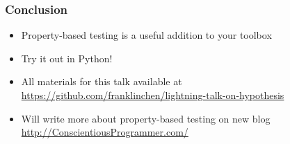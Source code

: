 \begin{frame}
  \frametitle{Conclusion}

  \begin{itemize}  
  \item Property-based testing is a useful addition to your toolbox
  \item Try it out in Python!
  \item All materials for this talk available at \url{https://github.com/franklinchen/lightning-talk-on-hypothesis}
  \item Will write more about property-based testing on new blog \url{http://ConscientiousProgrammer.com/}
  \end{itemize}

\end{frame}


